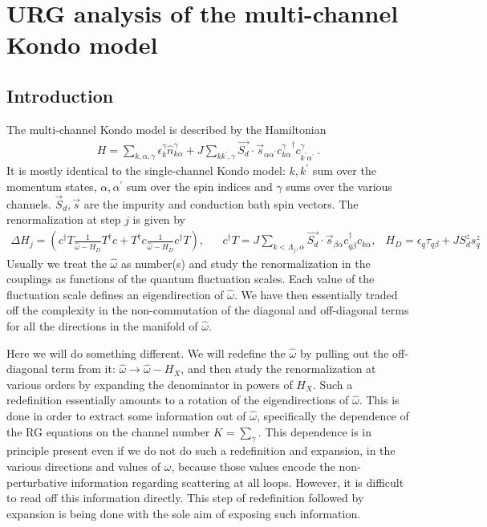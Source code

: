 \section{URG analysis of the multi-channel Kondo model}

\subsection{Introduction}
The multi-channel Kondo model is described by the Hamiltonian
\begin{equation}\begin{aligned}
	H = \sum_{k,\alpha,\gamma}\epsilon_{k}^\gamma \hat n^\gamma_{k\alpha} + J\sum_{kk^\prime,\gamma} \vec{S_d}\cdot\vec{s}_{\alpha\alpha^\prime}{c^\gamma_{k\alpha}}^\dagger c^\gamma_{k^\prime\alpha^\prime}~.
\end{aligned}\end{equation}
It is mostly identical to the single-channel Kondo model: \(k,k^\prime\) sum over the momentum states, \(\alpha,\alpha^\prime\) sum over the spin indices and \(\gamma\) sums over the various channels. \(\vec S_d, \vec s\) are the impurity and conduction bath spin vectors. The renormalization at step \(j\) is given by
\begin{equation}\begin{aligned}
	\Delta H_j = \left(c^\dagger T \frac{1}{\hat \omega - H_D}T^\dagger c + T^\dagger c \frac{1}{\hat \omega - H_D}c^\dagger T\right), && c^\dagger T = J \sum_{k < \Lambda_j, \alpha}\vec{S_d}\cdot\vec{s}_{\beta \alpha}c^\dagger_{q\beta}c_{k\alpha}, &H_D = \epsilon_q \tau_{q\beta} + J S_d^z s_q^z
\end{aligned}\end{equation}
Usually we treat the \(\hat \omega\) as number(s) and study the renormalization in the couplings as functions of the quantum fluctuation scales. Each value of the fluctuation scale defines an eigendirection of \(\hat \omega\). We have then essentially traded off the complexity in the non-commutation of the diagonal and off-diagonal terms for all the directions in the manifold of \(\hat \omega\).

Here we will do something different. We will redefine the \(\hat \omega\) by pulling out the off-diagonal term from it: \(\hat \omega \to \hat \omega - H_X\), and then study the renormalization at various orders by expanding the denominator in powers of \(H_X\). Such a redefinition essentially amounts to a rotation of the eigendirections of \(\hat \omega\). This is done in order to extract some information out of \(\hat \omega\), specifically the dependence of the RG equations on the channel number \(K = \sum_\gamma\). This dependence is in principle present even if we do not do such a redefinition and expansion, in the various directions and values of \(\omega\), because those values encode the non-perturbative information regarding scattering at all loops. However, it is difficult to read off this information directly. This step of redefinition followed by expansion is being done with the sole aim of exposing such information. 

